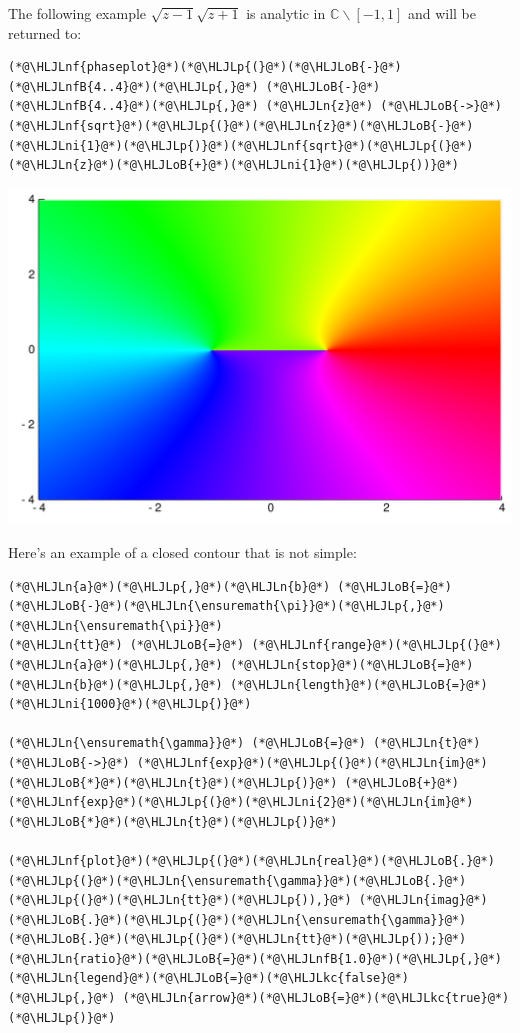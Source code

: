 \documentclass[12pt,a4paper]{article}
\newcommand{\HLJLkc}[1]{\textcolor[RGB]{59,151,46}{\textit{#1}}}
\newcommand{\HLJLn}[1]{#1}
\newcommand{\HLJLnf}[1]{\textcolor[RGB]{66,102,213}{#1}}
\newcommand{\HLJLnfB}[1]{\textcolor[RGB]{59,151,46}{#1}}
\newcommand{\HLJLni}[1]{\textcolor[RGB]{59,151,46}{#1}}
\newcommand{\HLJLoB}[1]{\textcolor[RGB]{102,102,102}{\textbf{#1}}}
\newcommand{\HLJLp}[1]{#1}
\begin{document}
The following example $\sqrt{z-1} \sqrt{z+1}$ is analytic in ${\mathbb C}\backslash [-1,1]$ and will be returned to:


\begin{lstlisting}
(*@\HLJLnf{phaseplot}@*)(*@\HLJLp{(}@*)(*@\HLJLoB{-}@*)(*@\HLJLnfB{4..4}@*)(*@\HLJLp{,}@*) (*@\HLJLoB{-}@*)(*@\HLJLnfB{4..4}@*)(*@\HLJLp{,}@*) (*@\HLJLn{z}@*) (*@\HLJLoB{->}@*) (*@\HLJLnf{sqrt}@*)(*@\HLJLp{(}@*)(*@\HLJLn{z}@*)(*@\HLJLoB{-}@*)(*@\HLJLni{1}@*)(*@\HLJLp{)}@*)(*@\HLJLnf{sqrt}@*)(*@\HLJLp{(}@*)(*@\HLJLn{z}@*)(*@\HLJLoB{+}@*)(*@\HLJLni{1}@*)(*@\HLJLp{))}@*)
\end{lstlisting}

\includegraphics[width=\linewidth]{figures/Lecture1_19_1.pdf}

Here's an example of a closed contour that is not simple:


\begin{lstlisting}
(*@\HLJLn{a}@*)(*@\HLJLp{,}@*)(*@\HLJLn{b}@*) (*@\HLJLoB{=}@*) (*@\HLJLoB{-}@*)(*@\HLJLn{\ensuremath{\pi}}@*)(*@\HLJLp{,}@*) (*@\HLJLn{\ensuremath{\pi}}@*)
(*@\HLJLn{tt}@*) (*@\HLJLoB{=}@*) (*@\HLJLnf{range}@*)(*@\HLJLp{(}@*)(*@\HLJLn{a}@*)(*@\HLJLp{,}@*) (*@\HLJLn{stop}@*)(*@\HLJLoB{=}@*)(*@\HLJLn{b}@*)(*@\HLJLp{,}@*) (*@\HLJLn{length}@*)(*@\HLJLoB{=}@*)(*@\HLJLni{1000}@*)(*@\HLJLp{)}@*)

(*@\HLJLn{\ensuremath{\gamma}}@*) (*@\HLJLoB{=}@*) (*@\HLJLn{t}@*) (*@\HLJLoB{->}@*) (*@\HLJLnf{exp}@*)(*@\HLJLp{(}@*)(*@\HLJLn{im}@*)(*@\HLJLoB{*}@*)(*@\HLJLn{t}@*)(*@\HLJLp{)}@*) (*@\HLJLoB{+}@*)(*@\HLJLnf{exp}@*)(*@\HLJLp{(}@*)(*@\HLJLni{2}@*)(*@\HLJLn{im}@*)(*@\HLJLoB{*}@*)(*@\HLJLn{t}@*)(*@\HLJLp{)}@*)

(*@\HLJLnf{plot}@*)(*@\HLJLp{(}@*)(*@\HLJLn{real}@*)(*@\HLJLoB{.}@*)(*@\HLJLp{(}@*)(*@\HLJLn{\ensuremath{\gamma}}@*)(*@\HLJLoB{.}@*)(*@\HLJLp{(}@*)(*@\HLJLn{tt}@*)(*@\HLJLp{)),}@*) (*@\HLJLn{imag}@*)(*@\HLJLoB{.}@*)(*@\HLJLp{(}@*)(*@\HLJLn{\ensuremath{\gamma}}@*)(*@\HLJLoB{.}@*)(*@\HLJLp{(}@*)(*@\HLJLn{tt}@*)(*@\HLJLp{));}@*) (*@\HLJLn{ratio}@*)(*@\HLJLoB{=}@*)(*@\HLJLnfB{1.0}@*)(*@\HLJLp{,}@*) (*@\HLJLn{legend}@*)(*@\HLJLoB{=}@*)(*@\HLJLkc{false}@*)(*@\HLJLp{,}@*) (*@\HLJLn{arrow}@*)(*@\HLJLoB{=}@*)(*@\HLJLkc{true}@*)(*@\HLJLp{)}@*)
\end{lstlisting}
\end{document}
